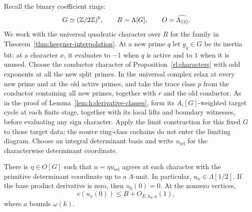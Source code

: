 Recall the binary coefficient rings:
\[
 G\simeq(\mathbb Z/2\mathbb Z)^b,\qquad R=\Lambda[G],\qquad
 O=\widehat{\Lambda_{(2)}}.
\]
We work with the universal quadratic character over $R$ for the
family in Theorem~\ref{thm:heegner-interpolation}. At a new prime $q$
let $g_q\in G$ be its inertia bit: at a character $x$, it evaluates
to $-1$ when $q$ is active and to $1$ when it is unused. Choose the
conductor character of Proposition~\ref{rl:characters} with odd
exponents at all the new split primes. In the universal complex relax
at every new prime and at the old active primes, and take the trace
class $p$ from the conductor containing all new primes, together with
$r$ and the old conductor. As in the proof of
Lemma~\ref{lem:h:derivative-classes}, form its $A_i[G]$-weighted
target cycle at each finite stage, together with its local lifts and
boundary witnesses, before evaluating any sign character. Apply the
limit construction for this fixed $G$ to those target data; the source
ring-class cochains do not enter the limiting diagram. Choose an integral determinant basis and
write $u_{\mathrm{rel}}$ for the characterwise determinant coordinate.

\begin{lemma}
\label{lem:h:unused-prime-correction}
There is $\eta\in O[G]$ such that
$u=\eta u_{\mathrm{rel}}$ agrees at each character with the primitive
determinant coordinate up to a $\Lambda$-unit. In particular,
$u_x\in\Lambda[1/2]$. If the base product derivative is zero, then
$u_0(0)=0$. At the nonzero vertices,
\begin{equation}\label{eq:h:normalized-vertex-bound}
 v(u_x(0))\le B+O_{E,h_0,a}(1),
\end{equation}
where $a$ bounds $\omega(k)$.
\end{lemma}

